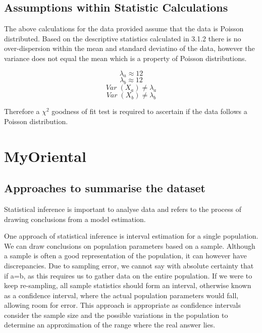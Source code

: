 \documentclass[11pt]{article}
\begin{document}
\subsection{Assumptions within Statistic Calculations}
The above calculations for the data provided assume that the data is Poisson distributed. Based on the descriptive statistics calculated in 3.1.2 there is no over-dispersion within the mean and standard deviatino of the data, however the variance does not equal the mean which is a property of Poisson distributions.
\begin{mdframed}
\begin{equation}
\lambda_a\approx12
\end{equation}
\begin{equation}
\lambda_b\approx12
\end{equation}
\begin{equation}
Var\;(X_a)\neq\lambda_a
\end{equation}
\begin{equation}
Var\;(X_b)\neq\lambda_b
\end{equation}
\end{mdframed}
Therefore a $\chi^2$ goodness of fit test is required to ascertain if the data follows a Poisson distribution.
\newpage
\section{MyOriental}
\subsection{Approaches to summarise the dataset}
Statistical inference is important to analyse data and refers to the process of drawing conclusions from a model estimation. 

One approach of statistical inference is interval estimation for a single population. We can draw conclusions on population parameters based on a sample. Although a sample is often a good representation of the population, it can however have discrepancies. Due to sampling error, we cannot say with absolute certainty that if a=b, as this requires us to gather data on the entire population. If we were to keep re-sampling, all sample statistics should form an interval, otherwise known as a confidence interval, where the actual population parameters would fall, allowing room for error. This approach is appropriate as confidence intervals consider the sample size and the possible variations in the population to determine an approximation of the range where the real answer lies. 
\end{document}
